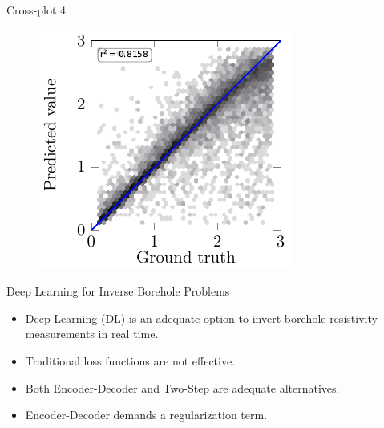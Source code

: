 \begin{frame}{Cross-plot 4}
\begin{figure}[!h]
{		\hspace{0.1cm}
		\includegraphics[scale=0.8]{Diapos/DL_For_Inv/Figures/Syn_example/Cross_plots/Two_Step_loss/C_P_4/rho_u.pdf}
		}	
\end{figure}	
\end{frame}


\begin{frame}{Deep Learning for Inverse Borehole Problems}
\begin{itemize}
\item Deep Learning (DL) is an adequate option to invert borehole resistivity measurements in real time.
\vspace{0.5cm}
\item Traditional loss functions are not effective.
\vspace{0.5cm}
\item Both Encoder-Decoder and Two-Step are adequate alternatives.
\vspace{0.5cm}
\item Encoder-Decoder demands a regularization term.
\end{itemize}
\end{frame}